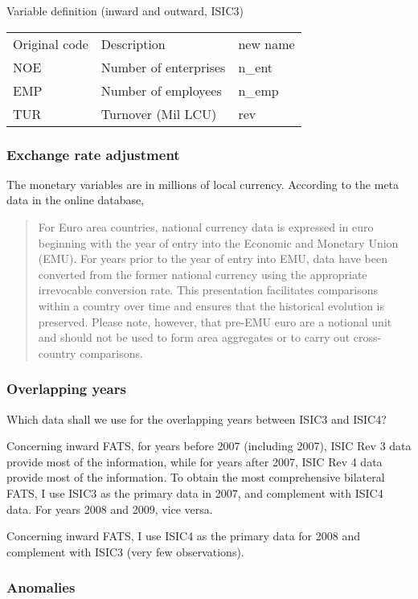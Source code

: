 \documentclass[notitlepage,11pt]{article}%
\begin{document}
Variable definition (inward and outward, ISIC3)%

\begin{tabular}
[c]{lll}%
Original code & Description & new name\\
NOE & Number of enterprises & n\_ent\\
EMP & Number of employees & n\_emp\\
TUR & Turnover (Mil LCU) & rev
\end{tabular}


\subsubsection{Exchange rate adjustment}

The monetary variables are in millions of local currency. According to the
meta data in the online database,

\begin{quotation}
For Euro area countries, national currency data is expressed in euro beginning
with the year of entry into the Economic and Monetary Union (EMU). For years
prior to the year of entry into EMU, data have been converted from the former
national currency using the appropriate irrevocable conversion rate. This
presentation facilitates comparisons within a country over time and ensures
that the historical evolution is preserved. Please note, however, that pre-EMU
euro are a notional unit and should not be used to form area aggregates or to
carry out cross-country comparisons.
\end{quotation}

\subsubsection{Overlapping years}

Which data shall we use for the overlapping years between ISIC3 and ISIC4?

Concerning inward FATS, for years before 2007 (including 2007), ISIC Rev 3
data provide most of the information, while for years after 2007, ISIC Rev 4
data provide most of the information. To obtain the most comprehensive
bilateral FATS, I use ISIC3 as the primary data in 2007, and complement with
ISIC4 data. For years 2008 and 2009, vice versa.

Concerning inward FATS, I use ISIC4 as the primary data for 2008 and
complement with ISIC3 (very few observations).

\subsubsection{Anomalies}
\end{document}
